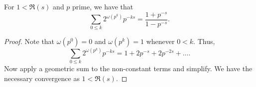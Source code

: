 \begin{theorem}
\label{two_pow_omega_tsum_prime_pow}
\leanok
For $1<\Re(s)$ and $p$ prime, we have that
    $$\sum_{0\leq k}2^{\omega(p^k)}p^{-ks}=\frac{1+p^{-s}}{1-p^{-s}}.$$
\end{theorem}
\begin{proof}
\leanok
Note that $\omega(p^0)=0$ and $\omega(p^k)=1$ whenever $0<k$. Thus,
    $$\sum_{0\leq k}2^{\omega(p^k)}p^{-ks}=1+2p^{-s}+2p^{-2s}+\ldots.$$
    Now apply a geometric sum to the non-constant terms and simplify. We have the necessary
    convergence as $1<\Re(s)$.
\end{proof}

